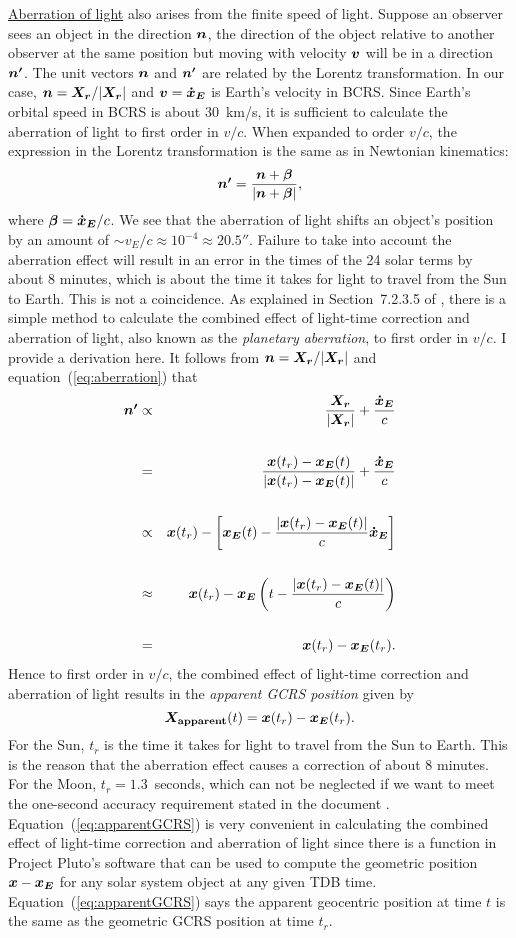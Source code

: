 \documentclass[12pt]{article}
\newcommand \beq {\begin{equation}}
\newcommand \eeq {\end{equation}}
\newcommand \beqn {\begin{eqnarray}}
\newcommand \eeqn {\end{eqnarray}}
\newcommand{\ve}[1]{\mbox{\boldmath $#1$}}
\newcommand{\expl}{\cite{expl}}
\begin{document}
\begin{CJK}{UTF8}{bkai}
\href{https://en.wikipedia.org/wiki/Aberration_of_light}{Aberration of light} 
also arises from the finite speed of light. Suppose an observer
sees an object in the direction $\ve{n}$, the direction of the object
relative to another observer at the same position but moving with velocity $\ve{v}$ will be in
a direction $\ve{n'}$. The unit vectors $\ve{n}$ and $\ve{n'}$ are related
by the Lorentz transformation. In our case, $\ve{n}=\ve{X_r}/|\ve{X_r}|$ 
and $\ve{v}=\ve{\dot{x}_E}$ is Earth's velocity in BCRS.
Since Earth's orbital speed in BCRS is about 
30~km/s, it is sufficient to calculate the aberration of light to first order 
in $v/c$. When expanded to order $v/c$, the expression in the Lorentz 
transformation is the same as in Newtonian kinematics:
\beq
  \ve{n'} = \frac{\ve{n} + \ve{\beta}}{|\ve{n} + \ve{\beta}|} ,
\label{eq:aberration}
\eeq
where $\ve{\beta} = \ve{\dot{x}_E}/c$. We see that the aberration of light shifts an 
object's position by an amount of $\sim v_E/c \approx 10^{-4}\approx 20.5''$. Failure to take into 
account the aberration effect will result in an error in the times of the 
24 solar terms by about 8 minutes, which is about the time it takes for light 
to travel from the Sun to Earth. This is not a coincidence. As explained in Section~7.2.3.5 
of \expl, there is a simple method to calculate the combined effect of light-time 
correction and aberration of light, also known as the {\em planetary aberration}, to 
first order in $v/c$. I provide a derivation here.  It follows from  
$\ve{n}=\ve{X_r}/|\ve{X_r}|$ and equation~(\ref{eq:aberration}) that 
\beqn
  \ve{n'} &\propto & \frac{\ve{X_r}}{|\ve{X_r}|} + \frac{\ve{\dot{x}_E}}{c} \cr \cr 
 &=& \frac{\ve{x}(t_r) - \ve{x_E}(t)}{|\ve{x}(t_r) - \ve{x_E}(t)|} + 
\frac{\ve{\dot{x}_E}}{c} \cr \cr 
 & \propto & \ve{x}(t_r) - \left[ \ve{x_E}(t) 
- \frac{|\ve{x}(t_r)-\ve{x_E}(t)|}{c} \ve{\dot{x}_E} \right] \cr \cr 
 &\approx & \ve{x}(t_r) - \ve{x_E}\left(t - \frac{|\ve{x}(t_r)-\ve{x_E}(t)|}{c}\right) 
\cr \cr 
 &=& \ve{x}(t_r) - \ve{x_E}(t_r) .
\eeqn
Hence to first order in $v/c$, the combined effect of light-time correction and 
aberration of light results in the {\em apparent GCRS position} given by 
\beq
  \ve{X_{\rm apparent}}(t) = \ve{x}(t_r) - \ve{x_E}(t_r) .
\label{eq:apparentGCRS}
\eeq
For the Sun, $t_r$ is the time it takes for light to travel from the Sun to Earth. 
This is the reason that the aberration effect causes a correction of about 8 minutes. 
For the Moon, $t_r =1.3$~seconds, which can not be neglected if we want to 
meet the one-second accuracy requirement stated in the document \cite{pmo17}. 
Equation~(\ref{eq:apparentGCRS})
is very convenient in calculating the combined effect of light-time correction and 
aberration of light since there is a function in Project Pluto's software that 
can be used to compute the geometric position $\ve{x}-\ve{x_E}$ for any solar system 
object at any given TDB time. Equation~(\ref{eq:apparentGCRS}) says the apparent 
geocentric position at time $t$ is the same as the geometric GCRS position 
at time $t_r$.


\end{CJK}
\end{document}
